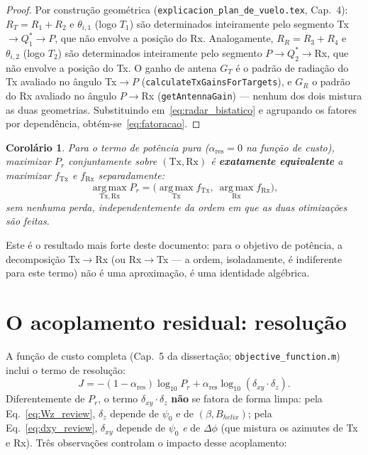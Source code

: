 \documentclass[12pt,a4paper,oneside]{book}
\newtheorem{corolario}{Corolário}[chapter]
\theoremstyle{definition}
\theoremstyle{remark}
\newcommand{\RT}{R_T}
\newcommand{\RR}{R_R}
\newcommand{\Prcv}{P_r}
\newcommand{\dxy}{\delta_{xy}}
\newcommand{\dz}{\delta_z}
\begin{document}
\begin{proof}
Por construção geométrica (\texttt{explicacion\_plan\_de\_vuelo.tex},
Cap.~4): $\RT=R_1+R_2$ e $\theta_{i,1}$ (logo $T_1$) são determinados
inteiramente pelo segmento Tx$\to Q_1^*\to P$, que não envolve a posição
do Rx. Analogamente, $\RR=R_3+R_4$ e $\theta_{i,2}$ (logo $T_2$) são
determinados inteiramente pelo segmento $P\to Q_2^*\to$Rx, que não envolve
a posição do Tx. O ganho de antena $G_T$ é o padrão de radiação do Tx
avaliado no ângulo Tx$\to P$ (\texttt{calculateTxGainsForTargets}), e
$G_R$ o padrão do Rx avaliado no ângulo $P\to$Rx
(\texttt{getAntennaGain}) — nenhum dos dois mistura as duas geometrias.
Substituindo em~\eqref{eq:radar_bistatico} e agrupando os fatores por
dependência, obtém-se~\eqref{eq:fatoracao}.
\end{proof}

\begin{corolario}
\label{cor:otimizacao_separavel}
Para o termo de potência pura ($\alpha_{\mathrm{res}}=0$ na função de
custo), maximizar $\Prcv$ conjuntamente sobre $(\mathrm{Tx},\mathrm{Rx})$
é \textbf{exatamente equivalente} a maximizar $f_{\mathrm{Tx}}$ e
$f_{\mathrm{Rx}}$ separadamente:
\[
  \operatorname*{arg\,max}_{\mathrm{Tx},\mathrm{Rx}} \Prcv
  = \Big(\operatorname*{arg\,max}_{\mathrm{Tx}} f_{\mathrm{Tx}},\ \operatorname*{arg\,max}_{\mathrm{Rx}} f_{\mathrm{Rx}}\Big),
\]
\emph{sem nenhuma perda}, independentemente da ordem em que as duas
otimizações são feitas.
\end{corolario}

Este é o resultado mais forte deste documento: para o objetivo de potência,
a decomposição Tx$\to$Rx (ou Rx$\to$Tx — a ordem, isoladamente, é
indiferente para este termo) não é uma aproximação, é uma identidade
algébrica.

\section{O acoplamento residual: resolução}
\label{sec:acoplamento}

A função de custo completa (Cap.~5 da dissertação;
\texttt{objective\_function.m}) inclui o termo de resolução:
\begin{equation}
  J = -(1-\alpha_{\mathrm{res}})\log_{10}\Prcv + \alpha_{\mathrm{res}}\log_{10}(\dxy\cdot\dz).
  \label{eq:custo_geral}
\end{equation}
Diferentemente de $\Prcv$, o termo $\dxy\cdot\dz$ \textbf{não} se fatora de
forma limpa: pela Eq.~\eqref{eq:Wz_review}, $\dz$ depende de $\psi_0$ e de
$(\beta,B_{helix})$; pela Eq.~\eqref{eq:dxy_review}, $\dxy$ depende de
$\psi_0$ \emph{e} de $\Delta\phi$ (que mistura os azimutes de Tx e Rx).
Três observações controlam o impacto desse acoplamento:
\end{document}
